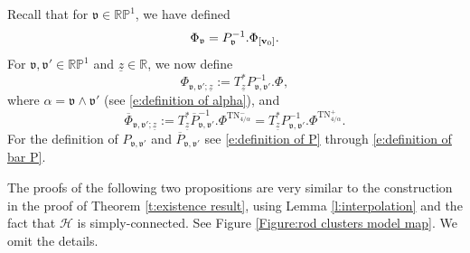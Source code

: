 \documentclass[a4paper,11pt]{amsart}
\theoremstyle{definition}
\numberwithin{equation}{section}
\newcommand{\R}{\mathbb{R}}
\newcommand{\dP}{\mathbb{P}}
\newcommand{\mv} {\mathfrak v}
\DeclareMathOperator{\bv}{{\bf v}}
\DeclareMathOperator{\TN}{TN}
\DeclareMathOperator{\TNam}{TN^{--}_\alpha}
\begin{document}
 Recall that for $\mv\in \R\dP^1$, we have defined
 \begin{equation} 
 	\Phi_{\mv}=P_\mv^{-1}. \Phi_{[\bv_0]}. 
 \end{equation}
For $\mv, \mv'\in \R\dP^1$ and $\underline z\in \R$, we now  define
\begin{equation}\label{e:definition of Phi mv mv' z}
    \Phi_{\mv, \mv'; \underline z}:=T_{\underline z}^*P_{\mv, \mv'}^{-1}.\Phi^{\TNam},
\end{equation}
where $\alpha=\mv\wedge\mv'$ (see \eqref{e:definition of alpha}), and  
\begin{equation}\label{e:definition of Phi mv mv' z TN+}
    \overline{\Phi}_{\mv, \mv'; \underline z}:=T_{\underline z}^*\overline{P}_{\mv, \mv'}^{-1}.\Phi^{\TN^-_{4/\alpha}}=T_{\underline z}^*{P}_{\mv, \mv'}^{-1}.\Phi^{\TN^+_{4/\alpha}}.
\end{equation}
For the definition of  $P_{\mv, \mv'}$ and $\overline{P}_{\mv, \mv'}$ see \eqref{e:definition of P} through \eqref{e:definition of bar P}.

The proofs of the following two propositions are very similar to the construction in the proof of Theorem \ref{t:existence result}, using Lemma \ref{l:interpolation}	and the fact that $\mathcal H$ is simply-connected. See Figure \ref{Figure:rod clusters model map}. We omit the details. 
\end{document}
